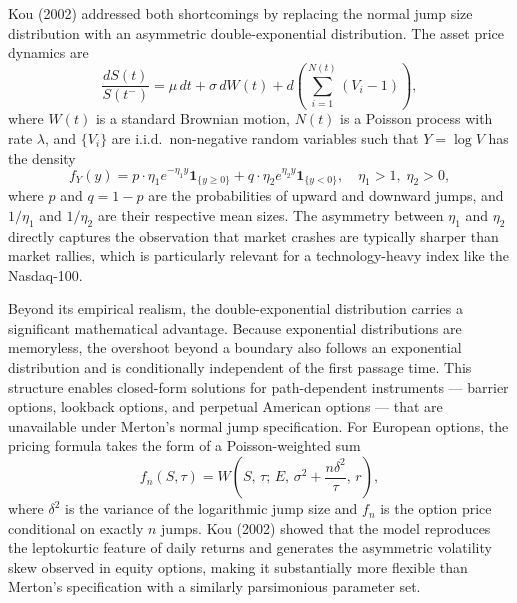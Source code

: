 \documentclass[12pt]{article}
\begin{document}
Kou (2002) addressed both shortcomings by replacing the normal jump size distribution with an asymmetric double-exponential distribution. The asset price dynamics are
\begin{equation}
\frac{dS(t)}{S(t^-)} = \mu\,dt + \sigma\,dW(t) + d\!\left(\sum_{i=1}^{N(t)}(V_i - 1)\right),
\end{equation}
where $W(t)$ is a standard Brownian motion, $N(t)$ is a Poisson process with rate $\lambda$, and $\{V_i\}$ are i.i.d.\ non-negative random variables such that $Y = \log V$ has the density
\begin{equation}
f_Y(y) = p\cdot\eta_1 e^{-\eta_1 y}\mathbf{1}_{\{y\geq 0\}} + q\cdot\eta_2 e^{\eta_2 y}\mathbf{1}_{\{y < 0\}},\quad \eta_1 > 1,\; \eta_2 > 0,
\end{equation}
where $p$ and $q = 1-p$ are the probabilities of upward and downward jumps, and $1/\eta_1$ and $1/\eta_2$ are their respective mean sizes. The asymmetry between $\eta_1$ and $\eta_2$ directly captures the observation that market crashes are typically sharper than market rallies, which is particularly relevant for a technology-heavy index like the Nasdaq-100.

Beyond its empirical realism, the double-exponential distribution carries a significant mathematical advantage. Because exponential distributions are memoryless, the overshoot beyond a boundary also follows an exponential distribution and is conditionally independent of the first passage time. This structure enables closed-form solutions for path-dependent instruments --- barrier options, lookback options, and perpetual American options --- that are unavailable under Merton's normal jump specification. For European options, the pricing formula takes the form of a Poisson-weighted sum
\begin{equation}
f_n(S,\tau) = W\!\left(S,\,\tau;\,E,\,\sigma^2 + \frac{n\delta^2}{\tau},\,r\right),
\end{equation}
where $\delta^2$ is the variance of the logarithmic jump size and $f_n$ is the option price conditional on exactly $n$ jumps. Kou (2002) showed that the model reproduces the leptokurtic feature of daily returns and generates the asymmetric volatility skew observed in equity options, making it substantially more flexible than Merton's specification with a similarly parsimonious parameter set.
\end{document}
